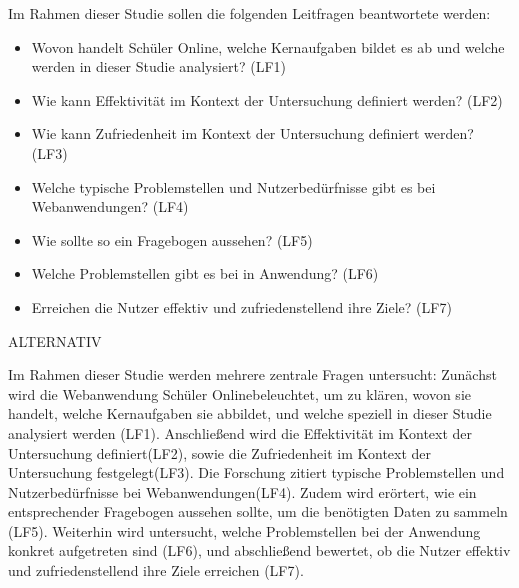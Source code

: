 Im Rahmen dieser Studie sollen die folgenden Leitfragen beantwortete werden: 
\begin{itemize}
    \item Wovon handelt Schüler Online, welche Kernaufgaben bildet es ab und welche werden in dieser Studie analysiert? (LF1)%
    \item Wie kann Effektivität im Kontext der Untersuchung definiert werden? (LF2)%
    \item Wie kann Zufriedenheit im Kontext der Untersuchung definiert werden? (LF3)%
    \item Welche typische Problemstellen und Nutzerbedürfnisse gibt es bei Webanwendungen? (LF4)%
    \item Wie sollte so ein Fragebogen aussehen? (LF5)%
    \item Welche Problemstellen gibt es bei in Anwendung? (LF6)%
    \item Erreichen die Nutzer effektiv und zufriedenstellend ihre Ziele? (LF7)%
\end{itemize}

ALTERNATIV  

Im Rahmen dieser Studie werden mehrere zentrale Fragen untersucht: Zunächst wird die Webanwendung \glqq Schüler Online\glqq  beleuchtet, um zu klären, wovon sie handelt, welche Kernaufgaben sie abbildet, und welche speziell in dieser Studie analysiert werden (LF1). Anschließend wird die Effektivität im Kontext der Untersuchung definiert(LF2), sowie die Zufriedenheit im Kontext der Untersuchung festgelegt(LF3). Die Forschung zitiert typische Problemstellen und Nutzerbedürfnisse bei Webanwendungen(LF4). Zudem wird erörtert, wie ein entsprechender Fragebogen aussehen sollte, um die benötigten Daten zu sammeln (LF5). Weiterhin wird untersucht, welche Problemstellen bei der Anwendung konkret aufgetreten sind (LF6), und abschließend bewertet, ob die Nutzer effektiv und zufriedenstellend ihre Ziele erreichen (LF7).

